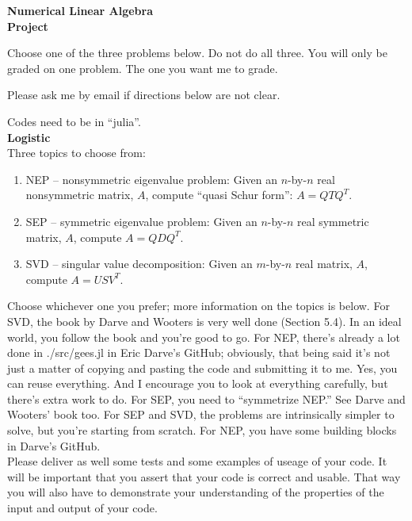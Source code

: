 \documentclass[11pt,letterpaper]{article}
\begin{document}
\begin{center}
{\Large \bf Numerical Linear Algebra }\\
{\Large \bf Project }\\
\end{center}

\small

Choose one of the three problems below. Do not do all three. You will only be
graded on one problem. The one you want me to grade.

Please ask me by email if directions below are not clear.

Codes need to be in ``julia''.\\
 
{\Large \bf Logistic}\\

Three topics to choose from: 
\begin{enumerate}
\item NEP --
nonsymmetric eigenvalue problem: Given an $n$-by-$n$ real nonsymmetric matrix, $A$,
compute ``quasi Schur form'': $A = Q T Q^T$.
\item SEP -- symmetric eigenvalue problem: Given an $n$-by-$n$ real symmetric matrix, $A$,
compute $A=QDQ^T$.
\item SVD -- singular value decomposition: Given an $m$-by-$n$ real matrix, $A$,
compute $A=USV^T$.
\end{enumerate}

Choose whichever one you prefer; more information on the topics is below. For
SVD, the book by Darve and Wooters is very well done (Section 5.4). In an ideal world,
you follow the book and you're good to go. For NEP, there's already a lot
done in ./src/gees.jl in Eric Darve's GitHub; obviously, that being said it's not just a matter
of copying and pasting the code and submitting it to me. Yes, you can reuse
everything. And I encourage you to look at everything carefully, but there's
extra work to do. For SEP, you need to ``symmetrize NEP.'' See Darve and
Wooters' book too. For SEP and SVD, the problems are intrinsically simpler to
solve, but you're starting from scratch. For NEP, you have some building blocks
in Darve's GitHub.\\

Please deliver as well some tests and some examples of useage of your code.  It
will be important that you assert that your code is correct and usable.  That
way you will also have to demonstrate your understanding of the properties of
the input and output of your code.
\end{document}
